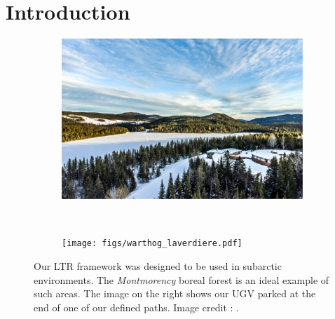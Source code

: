 \section{Introduction}
\label{sec:intro}

\lightlipsum[1]

\begin{figure} [h]
	\begin{center}
	\begin{subfigure}[b]{0.45\textwidth}
		\includegraphics[width=\linewidth]{figs/foret-montmorency.pdf}
		\label{fig:view_above}
	\end{subfigure}%
	~~
	\begin{subfigure} [b] {0.45\textwidth}
		\texttt{[image: figs/warthog\_laverdiere.pdf]}
		\label{fig:front_fig}
	\end{subfigure}
	\end{center}
	\caption{Our \ac{LTR} framework was designed to be used in subarctic environments.
	The \textit{Montmorency} boreal forest is an ideal example of such areas.
	The image on the right shows our \ac{UGV} parked at the end of one of our defined paths.
	Image credit : \foretmo.}
	\label{fig:intro}
\end{figure}

\lightlipsum[1]
\lightlipsum[1]
\lightlipsum[1]